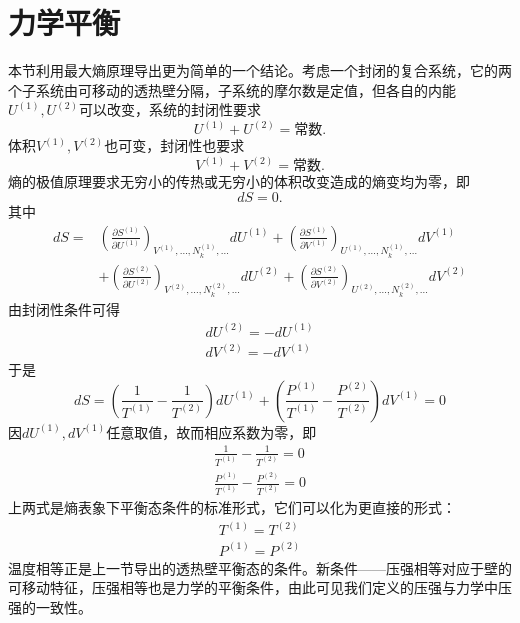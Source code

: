 \section{力学平衡}
\label{sec2.7}
本节利用最大熵原理导出更为简单的一个结论。考虑一个封闭的复合系统，它的两个子系统由可移动的透热壁分隔，子系统的摩尔数是定值，但各自的内能$U^{(1)}, U^{(2)}$可以改变，系统的封闭性要求
\begin{equation}
\label{equ2.46}
	U^{(1)} + U^{(2)} = \text{常数}.
\end{equation}
体积$V^{(1)}, V^{(2)}$也可变，封闭性也要求
\begin{equation}
\label{equ2.47}
	V^{(1)} + V^{(2)} = \text{常数}.
\end{equation}
熵的极值原理要求无穷小的传热或无穷小的体积改变造成的熵变均为零，即
\begin{equation}
\label{equ2.48}
	dS = 0.
\end{equation}
其中
\begin{equation}
\label{equ2.49}
\begin{split}
	dS =& \left( \frac{ \partial S^{(1)} }{ \partial U^{(1)} } \right)_{ V^{(1)}, \dots, N_k^{(1)}, \dots} dU^{(1)} + \left( \frac{ \partial S^{(1)} }{ \partial V^{(1)} } \right)_{ U^{(1)}, \dots, N_k^{(1)}, \dots} dV^{(1)} \\
	&+ \left( \frac{ \partial S^{(2)} }{ \partial U^{(2)} } \right)_{ V^{(2)}, \dots, N_k^{(2)}, \dots} dU^{(2)} + \left( \frac{ \partial S^{(2)} }{ \partial V^{(2)} } \right)_{ U^{(2)}, \dots, N_k^{(2)}, \dots} dV^{(2)}
\end{split}
\end{equation}
由封闭性条件可得
\begin{align}
\label{equ2.50}
	dU^{(2)} = -dU^{(1)} \\
\label{equ2.51}
	dV^{(2)} = -dV^{(1)}
\end{align}
于是
\begin{equation}
\label{equ2.52}
	dS = \left( \frac{1}{T^{(1)}} - \frac{1}{T^{(2)}} \right) dU^{(1)} + \left( \frac{ P^{(1)} }{ T^{(1)} } - \frac{ P^{(2)} }{ T^{(2)} } \right) dV^{(1)} = 0
\end{equation}
因$dU^{(1)}, dV^{(1)}$任意取值，故而相应系数为零，即
\begin{align}
	\frac{1}{T^{(1)}} - \frac{1}{T^{(2)}} = 0 \label{equ2.53} \\
	\frac{ P^{(1)} }{ T^{(1)} } - \frac{ P^{(2)} }{ T^{(2)} } = 0 \label{equ2.54}
\end{align}
上两式是熵表象下平衡态条件的标准形式，它们可以化为更直接的形式：
\begin{align}
	T^{(1)} = T^{(2)} \label{equ2.55} \\
	P^{(1)} = P^{(2)} \label{equ2.56}
\end{align}
温度相等正是上一节导出的透热壁平衡态的条件。新条件——压强相等对应于壁的可移动特征，压强相等也是力学的平衡条件，由此可见我们定义的压强与力学中压强的一致性。

